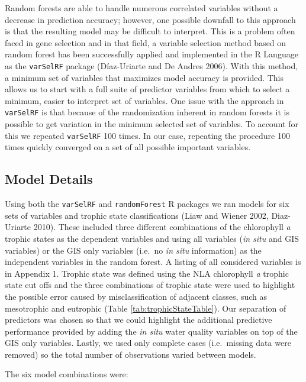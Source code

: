 \documentclass[11pt,]{article}
\begin{document}
Random forests are able to handle numerous correlated variables without
a decrease in prediction accuracy; however, one possible downfall to
this approach is that the resulting model may be difficult to interpret.
This is a problem often faced in gene selection and in that field, a
variable selection method based on random forest has been successfully
applied and implemented in the R Language as the \texttt{varSelRF}
package (D{í}az-Uriarte and De Andres 2006). With this method, a minimum
set of variables that maximizes model accuracy is provided. This allows
us to start with a full suite of predictor variables from which to
select a minimum, easier to interpret set of variables. One issue with
the approach in \texttt{varSelRF} is that because of the randomization
inherent in random forests it is possible to get variation in the
minimum selected set of variables. To account for this we repeated
\texttt{varSelRF} 100 times. In our case, repeating the procedure 100
times quickly converged on a set of all possible important variables.

\subsection{Model Details}\label{model-details}

Using both the \texttt{varSelRF} and \texttt{randomForest} R packages we
ran models for six sets of variables and trophic state classifications
(Liaw and Wiener 2002, Diaz-Uriarte 2010). These included three
different combinations of the chlorophyll \emph{a} trophic states as the
dependent variables and using all variables (\emph{in situ} and GIS
variables) or the GIS only variables (i.e.~no \emph{in situ}
information) as the independent variables in the random forest. A
listing of all considered variables is in Appendix 1. Trophic state was
defined using the NLA chlorophyll \emph{a} trophic state cut offs and
the three combinations of trophic state were used to highlight the
possible error caused by misclassification of adjacent classes, such as
mesotrophic and eutrophic (Table \ref{tab:trophicStateTable}). Our
separation of predictors was chosen so that we could highlight the
additional predictive performance provided by adding the \emph{in situ}
water quality variables on top of the GIS only variables. Lastly, we
used only complete cases (i.e.~missing data were removed) so the total
number of observations varied between models.

The six model combinations were:
\end{document}
